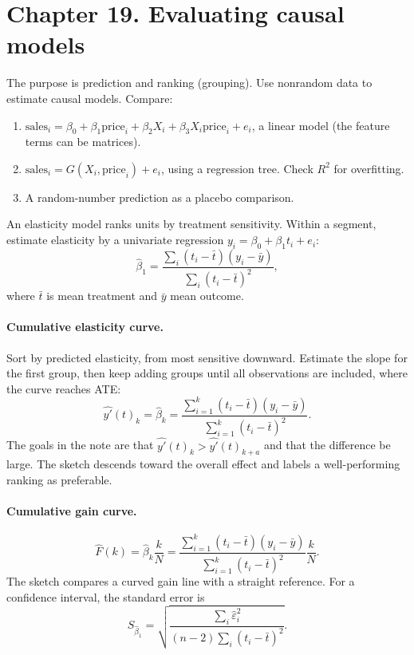 \section{Chapter 19. Evaluating causal models}
The purpose is prediction and ranking (grouping). Use nonrandom data to estimate causal models. Compare:
\begin{enumerate}
\item $\mathrm{sales}_i=\beta_0+\beta_1\mathrm{price}_i+\beta_2X_i+\beta_3X_i\mathrm{price}_i+e_i$, a linear model (the feature terms can be matrices).
\item $\mathrm{sales}_i=G(X_i,\mathrm{price}_i)+e_i$, using a regression tree. Check $R^2$ for overfitting.
\item A random-number prediction as a placebo comparison.
\end{enumerate}
An elasticity model ranks units by treatment sensitivity. Within a segment, estimate elasticity by a univariate regression $y_i=\beta_0+\beta_1t_i+e_i$:
\[\hat\beta_1=\frac{\sum_i(t_i-\bar t)(y_i-\bar y)}{\sum_i(t_i-\bar t)^2},\]
where $\bar t$ is mean treatment and $\bar y$ mean outcome.

\paragraph{Cumulative elasticity curve.}
Sort by predicted elasticity, from most sensitive downward. Estimate the slope for the first group, then keep adding groups until all observations are included, where the curve reaches ATE:
\[\widehat{y'}(t)_k=\hat\beta_k=
\frac{\sum_{i=1}^{k}(t_i-\bar t)(y_i-\bar y)}{\sum_{i=1}^{k}(t_i-\bar t)^2}.\]
The goals in the note are that $\widehat{y'}(t)_k>\widehat{y'}(t)_{k+a}$ and that the difference be large. The sketch descends toward the overall effect and labels a well-performing ranking as preferable.

\paragraph{Cumulative gain curve.}
\[\widehat F(k)=\hat\beta_k\frac{k}{N}
=\frac{\sum_{i=1}^{k}(t_i-\bar t)(y_i-\bar y)}{\sum_{i=1}^{k}(t_i-\bar t)^2}\frac{k}{N}.\]
The sketch compares a curved gain line with a straight reference. For a confidence interval, the standard error is
\[S_{\hat\beta_1}=\sqrt{\frac{\sum_i\hat\varepsilon_i^2}{(n-2)\sum_i(t_i-\bar t)^2}}.\]

